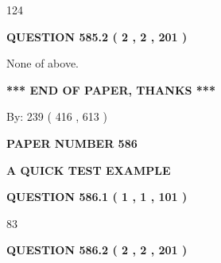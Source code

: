 \documentclass[12pt]{article}
\begin{document}
124
 
 
  
\vspace{0.2in}
  
{\textbf{\Large{QUESTION
585.2 
 ( 2 , 2 , 201 )
}}}
  
  
 
 
\noindent{}
 
 
 None of above.
 
 
 
 
   
   
 \vspace{0.2in}
 
   
   
   
   
\vspace{1.0in} 
{\textbf{\large{ *** END OF PAPER, THANKS *** }}} 
   
   
\hspace{1.0in} By: 
 239 ( 416 ,  613 )
   
   
   
   
\newpage 
\setcounter{page}{ 
   586001 } 
   
   
   
   
 {\textbf{ \Large{ PAPER NUMBER  586  }}}
   
   
\vspace{0.2in}
   
   
   
   
   
   
 \vspace{0.2in}
{\LARGE {\textbf{ A QUICK TEST EXAMPLE}}}
   
   
  
\vspace{0.2in}
  
{\textbf{\Large{QUESTION
586.1 
 ( 1 , 1 , 101 )
}}}
  
  
 
 
\noindent{}

83
 
 
  
\vspace{0.2in}
  
{\textbf{\Large{QUESTION
586.2 
 ( 2 , 2 , 201 )
}}}
  
  
 
\end{document}
